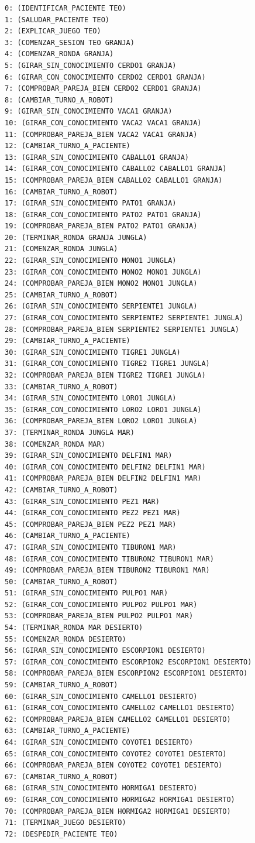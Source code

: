 \documentclass{uc3mpracticas}
\begin{document}
    \begin{lstlisting}
0: (IDENTIFICAR_PACIENTE TEO)
1: (SALUDAR_PACIENTE TEO)
2: (EXPLICAR_JUEGO TEO)
3: (COMENZAR_SESION TEO GRANJA)
4: (COMENZAR_RONDA GRANJA)
5: (GIRAR_SIN_CONOCIMIENTO CERDO1 GRANJA)
6: (GIRAR_CON_CONOCIMIENTO CERDO2 CERDO1 GRANJA)
7: (COMPROBAR_PAREJA_BIEN CERDO2 CERDO1 GRANJA)
8: (CAMBIAR_TURNO_A_ROBOT)
9: (GIRAR_SIN_CONOCIMIENTO VACA1 GRANJA)
10: (GIRAR_CON_CONOCIMIENTO VACA2 VACA1 GRANJA)
11: (COMPROBAR_PAREJA_BIEN VACA2 VACA1 GRANJA)
12: (CAMBIAR_TURNO_A_PACIENTE)
13: (GIRAR_SIN_CONOCIMIENTO CABALLO1 GRANJA)
14: (GIRAR_CON_CONOCIMIENTO CABALLO2 CABALLO1 GRANJA)
15: (COMPROBAR_PAREJA_BIEN CABALLO2 CABALLO1 GRANJA)
16: (CAMBIAR_TURNO_A_ROBOT)
17: (GIRAR_SIN_CONOCIMIENTO PATO1 GRANJA)
18: (GIRAR_CON_CONOCIMIENTO PATO2 PATO1 GRANJA)
19: (COMPROBAR_PAREJA_BIEN PATO2 PATO1 GRANJA)
20: (TERMINAR_RONDA GRANJA JUNGLA)
21: (COMENZAR_RONDA JUNGLA)
22: (GIRAR_SIN_CONOCIMIENTO MONO1 JUNGLA)
23: (GIRAR_CON_CONOCIMIENTO MONO2 MONO1 JUNGLA)
24: (COMPROBAR_PAREJA_BIEN MONO2 MONO1 JUNGLA)
25: (CAMBIAR_TURNO_A_ROBOT)
26: (GIRAR_SIN_CONOCIMIENTO SERPIENTE1 JUNGLA)
27: (GIRAR_CON_CONOCIMIENTO SERPIENTE2 SERPIENTE1 JUNGLA)
28: (COMPROBAR_PAREJA_BIEN SERPIENTE2 SERPIENTE1 JUNGLA)
29: (CAMBIAR_TURNO_A_PACIENTE)
30: (GIRAR_SIN_CONOCIMIENTO TIGRE1 JUNGLA)
31: (GIRAR_CON_CONOCIMIENTO TIGRE2 TIGRE1 JUNGLA)
32: (COMPROBAR_PAREJA_BIEN TIGRE2 TIGRE1 JUNGLA)
33: (CAMBIAR_TURNO_A_ROBOT)
34: (GIRAR_SIN_CONOCIMIENTO LORO1 JUNGLA)
35: (GIRAR_CON_CONOCIMIENTO LORO2 LORO1 JUNGLA)
36: (COMPROBAR_PAREJA_BIEN LORO2 LORO1 JUNGLA)
37: (TERMINAR_RONDA JUNGLA MAR)
38: (COMENZAR_RONDA MAR)
39: (GIRAR_SIN_CONOCIMIENTO DELFIN1 MAR)
40: (GIRAR_CON_CONOCIMIENTO DELFIN2 DELFIN1 MAR)
41: (COMPROBAR_PAREJA_BIEN DELFIN2 DELFIN1 MAR)
42: (CAMBIAR_TURNO_A_ROBOT)
43: (GIRAR_SIN_CONOCIMIENTO PEZ1 MAR)
44: (GIRAR_CON_CONOCIMIENTO PEZ2 PEZ1 MAR)
45: (COMPROBAR_PAREJA_BIEN PEZ2 PEZ1 MAR)
46: (CAMBIAR_TURNO_A_PACIENTE)
47: (GIRAR_SIN_CONOCIMIENTO TIBURON1 MAR)
48: (GIRAR_CON_CONOCIMIENTO TIBURON2 TIBURON1 MAR)
49: (COMPROBAR_PAREJA_BIEN TIBURON2 TIBURON1 MAR)
50: (CAMBIAR_TURNO_A_ROBOT)
51: (GIRAR_SIN_CONOCIMIENTO PULPO1 MAR)
52: (GIRAR_CON_CONOCIMIENTO PULPO2 PULPO1 MAR)
53: (COMPROBAR_PAREJA_BIEN PULPO2 PULPO1 MAR)
54: (TERMINAR_RONDA MAR DESIERTO)
55: (COMENZAR_RONDA DESIERTO)
56: (GIRAR_SIN_CONOCIMIENTO ESCORPION1 DESIERTO)
57: (GIRAR_CON_CONOCIMIENTO ESCORPION2 ESCORPION1 DESIERTO)
58: (COMPROBAR_PAREJA_BIEN ESCORPION2 ESCORPION1 DESIERTO)
59: (CAMBIAR_TURNO_A_ROBOT)
60: (GIRAR_SIN_CONOCIMIENTO CAMELLO1 DESIERTO)
61: (GIRAR_CON_CONOCIMIENTO CAMELLO2 CAMELLO1 DESIERTO)
62: (COMPROBAR_PAREJA_BIEN CAMELLO2 CAMELLO1 DESIERTO)
63: (CAMBIAR_TURNO_A_PACIENTE)
64: (GIRAR_SIN_CONOCIMIENTO COYOTE1 DESIERTO)
65: (GIRAR_CON_CONOCIMIENTO COYOTE2 COYOTE1 DESIERTO)
66: (COMPROBAR_PAREJA_BIEN COYOTE2 COYOTE1 DESIERTO)
67: (CAMBIAR_TURNO_A_ROBOT)
68: (GIRAR_SIN_CONOCIMIENTO HORMIGA1 DESIERTO)
69: (GIRAR_CON_CONOCIMIENTO HORMIGA2 HORMIGA1 DESIERTO)
70: (COMPROBAR_PAREJA_BIEN HORMIGA2 HORMIGA1 DESIERTO)
71: (TERMINAR_JUEGO DESIERTO)
72: (DESPEDIR_PACIENTE TEO)
    \end{lstlisting}
\end{document}
